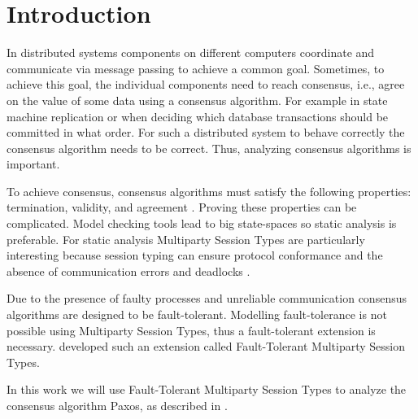 \chapter{Introduction}
In distributed systems components on different computers coordinate and communicate via message passing to achieve a common goal.
Sometimes, to achieve this goal, the individual components need to reach consensus, i.e., agree on the value of some data using a consensus algorithm.
For example in state machine replication or when deciding which database transactions should be committed in what order.
For such a distributed system to behave correctly the consensus algorithm needs to be correct.
Thus, analyzing consensus algorithms is important.

To achieve consensus, consensus algorithms must satisfy the following properties: termination, validity, and agreement \cite{dist_sys}.
Proving these properties can be complicated.
Model checking tools lead to big state-spaces so static analysis is preferable.
For static analysis Multiparty Session Types are particularly interesting because session typing can ensure protocol conformance and the absence of communication errors and deadlocks \cite{mpstbd}.

Due to the presence of faulty processes and unreliable communication consensus algorithms are designed to be fault-tolerant.
Modelling fault-tolerance is not possible using Multiparty Session Types, thus a fault-tolerant extension is necessary.
\citeauthor{ftmpst} developed such an extension called Fault-Tolerant Multiparty Session Types.

In this work we will use Fault-Tolerant Multiparty Session Types to analyze the consensus algorithm Paxos, as described in \cite{lamport2001paxos}.



